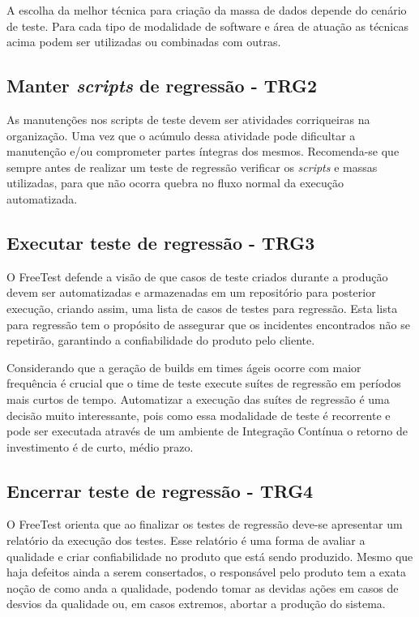A escolha da melhor técnica para criação da massa de dados depende do cenário de teste. Para cada tipo de modalidade de software e área de atuação as técnicas acima podem ser utilizadas ou combinadas com outras.

\subsection{Manter \textit{scripts} de regressão - TRG2}

As manutenções nos scripts de teste devem ser atividades corriqueiras na organização. Uma vez que o acúmulo dessa atividade pode dificultar a manutenção e/ou comprometer partes íntegras dos mesmos. Recomenda-se que sempre antes de realizar um teste de regressão verificar os \textit{scripts} e massas utilizadas, para que não ocorra quebra no fluxo normal da execução automatizada.

\subsection{Executar teste de regressão - TRG3}

O FreeTest defende a visão de que casos de teste criados durante a produção devem ser automatizadas e armazenadas em um repositório para posterior execução, criando assim, uma lista de casos de testes para regressão. Esta lista para regressão tem o propósito de assegurar que os incidentes encontrados não se repetirão, garantindo a confiabilidade do produto pelo cliente.

Considerando que a geração de builds em times ágeis ocorre com maior frequência é crucial que o time de teste execute suítes de regressão em períodos mais curtos de tempo. Automatizar a execução das suítes de regressão é uma decisão muito interessante, pois como essa modalidade de teste é recorrente e pode ser executada através de um ambiente de Integração Contínua o retorno de investimento é de curto, médio prazo.

	
\subsection{Encerrar teste de regressão - TRG4}

O FreeTest orienta que ao finalizar os testes de regressão deve-se apresentar um relatório da execução dos testes. Esse relatório é uma forma de avaliar a qualidade e criar confiabilidade no produto que está sendo produzido. Mesmo que haja defeitos ainda a serem consertados, o responsável pelo produto tem a exata noção de como anda a qualidade, podendo tomar as devidas ações em casos de desvios da qualidade ou, em casos extremos, abortar a produção do sistema.


